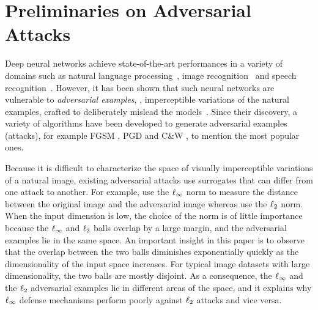 %



\newpage

\section{Preliminaries on Adversarial Attacks}
\label{section:ch2-preliminaries_on_adversarial_attacks}

Deep neural networks achieve state-of-the-art performances in a variety of domains such as natural language processing~\cite{radford2018Language}, image recognition~\cite{he2016deep} and speech recognition~\cite{hinton2012deep}.
However, it has been shown that such neural networks are vulnerable to \emph{adversarial examples}, \ie, imperceptible variations of the natural examples, crafted to deliberately mislead the models~\cite{globerson2006nightmare,biggio2013evasion,szegedy2013intriguing}.
Since their discovery, a variety of algorithms have been developed to generate adversarial examples (\aka attacks), for example FGSM \cite{goodfellow2014explaining}, PGD \cite{madry2018towards} and C\&W \cite{carlini2017towards}, to mention the most popular ones.

Because it is difficult to characterize the space of visually imperceptible variations of a natural image, existing adversarial attacks use surrogates that can differ from one attack to another.
For example, \citet{goodfellow2014explaining} use the $\ell_\infty $ norm to measure the distance between the original image and the adversarial image whereas \citet{carlini2017towards} use the $\ell_2 $ norm.
When the input dimension is low, the choice of the norm is of little importance because the $\ell_\infty $ and $\ell_2 $ balls overlap by a large margin, and the adversarial examples lie in the same space.
An important insight in this paper is to observe that the overlap between the two balls  diminishes exponentially quickly as the dimensionality of the input space increases.
For typical image datasets with large dimensionality, the two balls are mostly disjoint.
As a consequence, the $\ell_\infty $ and the $\ell_2 $ adversarial examples lie in different areas of the space, and it explains why $\ell_\infty $ defense mechanisms perform poorly against $\ell_2 $ attacks and vice versa. 

